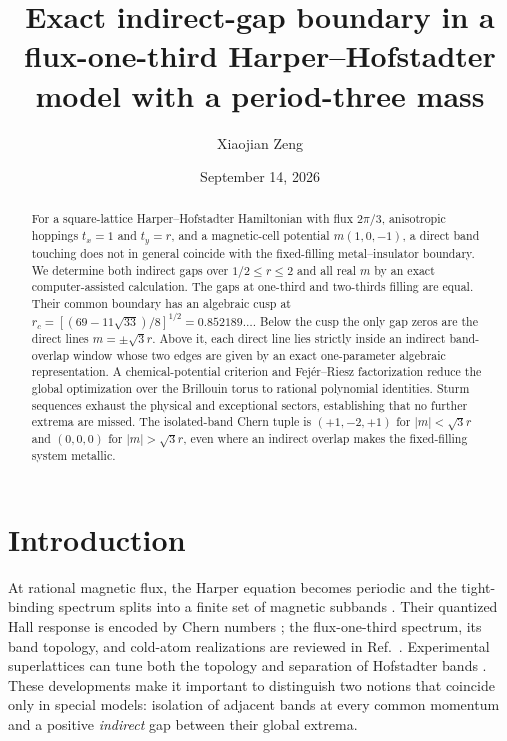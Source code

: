 \documentclass[aps,prb,preprint,superscriptaddress,nofootinbib]{revtex4-2}
\begin{document}
\raggedbottom

\title{Exact indirect-gap boundary in a flux-one-third Harper--Hofstadter model with a period-three mass}

\author{Xiaojian Zeng}

\date{September 14, 2026}

\begin{abstract}
For a square-lattice Harper--Hofstadter Hamiltonian with flux $2\pi/3$,
anisotropic hoppings $t_x=1$ and $t_y=r$, and a magnetic-cell potential
$m(1,0,-1)$, a direct band touching does not in general coincide with the
fixed-filling metal--insulator boundary.  We determine both indirect gaps over
$1/2\leq r\leq2$ and all real $m$ by an exact computer-assisted calculation.
The gaps at one-third and two-thirds filling are equal.  Their common boundary
has an algebraic cusp at
$r_c=[(69-11\sqrt{33})/8]^{1/2}=0.852189\ldots$.  Below the cusp the only gap
zeros are the direct lines $m=\pm\sqrt3r$.  Above it, each direct line lies
strictly inside an indirect band-overlap window whose two edges are given by an
exact one-parameter algebraic representation.  A chemical-potential criterion
and Fej\'er--Riesz factorization reduce the global optimization over the
Brillouin torus to rational polynomial identities.  Sturm sequences exhaust
the physical and exceptional sectors, establishing that no further extrema
are missed.  The isolated-band Chern tuple is $(+1,-2,+1)$ for
$|m|<\sqrt3r$ and $(0,0,0)$ for $|m|>\sqrt3r$, even where an indirect overlap
makes the fixed-filling system metallic.
\end{abstract}

\maketitle

\section{Introduction}

At rational magnetic flux, the Harper equation becomes periodic and the
tight-binding spectrum splits into a finite set of magnetic subbands
\cite{Hofstadter1976}.  Their quantized Hall response is encoded by Chern
numbers \cite{TKNN1982}; the flux-one-third spectrum, its band topology, and
cold-atom realizations are reviewed in Ref.~\cite{Cooper2019}.  Experimental
superlattices can tune both the topology and separation of Hofstadter bands
\cite{Aidelsburger2015}.  These developments make it important to distinguish
two notions that coincide only in special models: isolation of adjacent bands
at every common momentum and a positive \emph{indirect} gap between their
global extrema.
\end{document}
